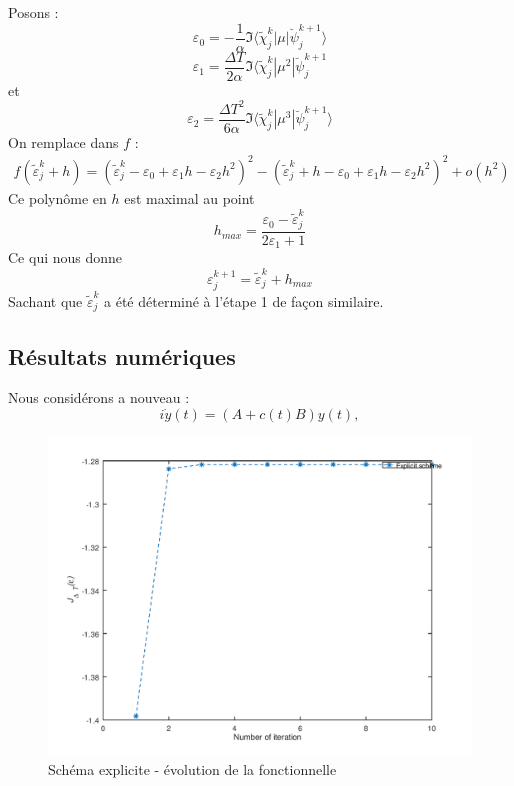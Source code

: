Posons :
\begin{equation}
\varepsilon_0=-\frac{1}{\alpha} \Im \langle \tilde{\chi}_j^k |\mu| \breve{\psi}_j^{k+1} \rangle
\end{equation}
\begin{equation}
\varepsilon_1=\frac{\Delta T}{2\alpha} \Im \langle \tilde{\chi}_j^k |\mu^2| \breve{\psi}_j^{k+1}
\end{equation}
et
\begin{equation}
\varepsilon_2=\frac{\Delta T^2}{6\alpha} \Im \langle \tilde{\chi}_j^k |\mu^3| \breve{\psi}_j^{k+1} \rangle
\end{equation}
On remplace dans $f$ :
\begin{align*}
f(\tilde{\varepsilon}_j^k+h)= (\tilde{\varepsilon}_j^k-\varepsilon_0+\varepsilon_1 h-\varepsilon_2 h^2)^2 - (\tilde{\varepsilon}_j^k+h-\varepsilon_0+\varepsilon_1 h-\varepsilon_2 h^2)^2 + o(h^2)
\end{align*}
Ce polynôme en $h$ est maximal au point
\begin{equation}
h_{max}=\dfrac{\varepsilon_0-\tilde{\varepsilon}_j^k}{2\varepsilon_1+1}
\end{equation}
Ce qui nous donne 
\begin{equation}
\varepsilon_j^{k+1}= \tilde{\varepsilon}_j^k+h_{max}
\end{equation}
Sachant que $\tilde{\varepsilon}_j^k$ a été déterminé à l'étape 1 de façon similaire.
\subsection{Résultats numériques}
Nous considérons a nouveau :
\begin{equation}
i\dot y(t)= (A+c(t)B)y(t),
\end{equation}

\begin{figure}[H]
	\caption{Schéma explicite - évolution de la fonctionnelle}
	\centering
	\includegraphics[scale=0.7]{images/explicit_func.png}
\end{figure}

